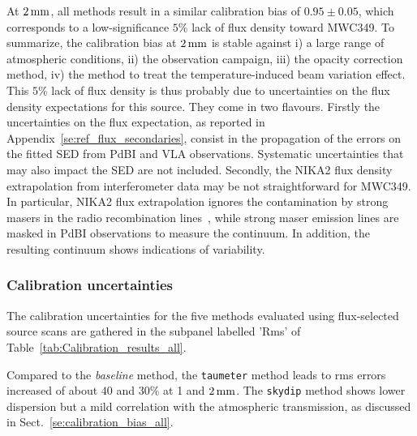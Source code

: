 At $2\,\rm{mm}$, all methods result in a similar calibration bias
of $0.95 \pm 0.05$, which corresponds to a low-significance $5\%$
lack of flux density toward MWC349.
To summarize, the calibration bias at $2\, \rm{mm}$ is stable against
i) a large range of atmospheric conditions, ii) the observation campaign, iii) the
opacity correction method, iv) the method to treat the
temperature-induced beam variation effect.
This $5\%$ lack of flux density is thus probably due to
uncertainties on the flux density expectations for this source.
They come in two flavours.
{\lp Firstly the uncertainties on the flux expectation, as reported in
Appendix~\ref{se:ref_flux_secondaries}, consist in the propagation of
the errors on the fitted SED from PdBI and VLA observations. Systematic
uncertainties that may also impact the SED are not included.}  
Secondly, the NIKA2 flux density extrapolation from
interferometer data may be not straightforward for MWC349. {\lp In
particular, NIKA2 flux extrapolation ignores the contamination by
strong masers in the radio recombination lines~\citep{masingRRL},
while strong maser emission lines are masked in PdBI observations to
measure the continuum. In addition, the resulting continuum shows
indications of variability.}


\subsubsection{Calibration uncertainties}

The calibration uncertainties for the five methods evaluated using
flux-selected source scans are gathered in the subpanel labelled 'Rms'
of Table~\ref{tab:Calibration_results_all}.

Compared to the \emph{baseline} method, the {\tt taumeter} method leads to 
rms errors increased of about $40$ and $30\%$ at 1 and
$2\,\rm{mm}$. The {\tt skydip} method shows lower dispersion but a
mild correlation with the atmospheric transmission, as
discussed in Sect.~\ref{se:calibration_bias_all}.

